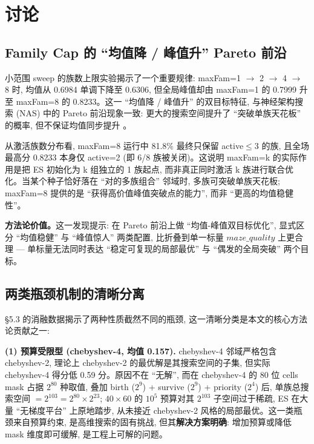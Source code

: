 
\section{讨论}
\label{sec:discussion}

\subsection{Family Cap 的 ``均值降 / 峰值升'' Pareto 前沿}

小范围 sweep 的族数上限实验揭示了一个重要规律: maxFam=1 $\to$ 2 $\to$ 4 $\to$ 8 时, 均值从 0.6984 单调下降至 0.6306, 但全局峰值却由 maxFam=1 的 0.7999 升至 maxFam=8 的 0.8233。这一 ``均值降 / 峰值升'' 的双目标特征, 与神经架构搜索 (NAS) 中的 Pareto 前沿现象一致: 更大的搜索空间提升了 ``突破单族天花板'' 的概率, 但不保证均值同步提升 \cite{liu2018darts, real2019regularized}。

从激活族数分布看, maxFam=8 运行中 81.8\% 最终只保留 active$\le$3 的族, 且全场最高分 0.8233 本身仅 active=2 (即 6/8 族被关闭)。这说明 maxFam=k 的实际作用是把 ES 初始化为 k 组独立的 1 族起点, 而非真正同时激活 k 族进行联合优化。当某个种子恰好落在 ``对的多族组合'' 邻域时, 多族可突破单族天花板; maxFam=8 提供的是 ``获得高价值峰值突破点的能力'', 而非 ``更高的均值稳健性''。

\medskip\noindent\textbf{方法论价值。}这一发现提示: 在 Pareto 前沿上做 ``均值-峰值双目标优化'', 显式区分 ``均值稳健'' 与 ``峰值惊人'' 两类配置, 比折叠到单一标量 $maze\_quality$ 上更合理 --- 单标量无法同时表达 ``稳定可复现的局部最优'' 与 ``偶发的全局突破'' 两个目标。

\subsection{两类瓶颈机制的清晰分离}

§5.3 的消融数据揭示了两种性质截然不同的瓶颈, 这一清晰分类是本文的核心方法论贡献之一:

\noindent\textbf{(1) 预算受限型 (chebyshev-4, 均值 0.157).}
chebyshev-4 邻域严格包含 chebyshev-2, 理论上 chebyshev-2 的最优解是其搜索空间的子集, 但实际 chebyshev-4 得分低 0.59 分。原因不在 ``无解'', 而在 chebyshev-4 的 80 位 cells mask 占据 $2^{80}$ 种取值, 叠加 birth ($2^9$) + survive ($2^9$) + priority ($2^4$) 后, 单族总搜索空间 $= 2^{103} = 2^{80} \times 2^{23}$; $40 \times 60$ 的 $10^5$ 预算对其 $2^{103}$ 子空间过于稀疏, ES 在大量 ``无梯度平台'' 上原地踏步, 从未接近 chebyshev-2 风格的局部最优。这一类瓶颈来自预算约束, 是高维搜索的固有挑战, 但其\textbf{解决方案明确}: 增加预算或降低 mask 维度即可缓解, 是工程上可解的问题。

